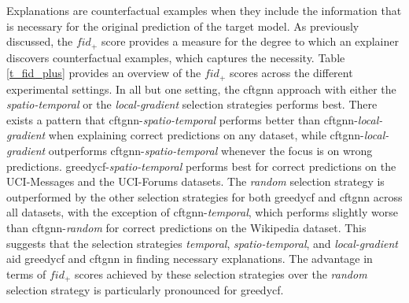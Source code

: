 Explanations are counterfactual examples when they include the information that is necessary for the original prediction of the target model. As previously discussed, the $fid_+$ score provides a measure for the degree to which an explainer discovers counterfactual examples, which captures the necessity. Table \ref{t_fid_plus} provides an overview of the $fid_+$ scores across the different experimental settings. In all but one setting, the \gls{cftgnn} approach with either the \textit{spatio-temporal} or the \textit{local-gradient} selection strategies performs best. There exists a pattern that \gls{cftgnn}-\textit{spatio-temporal} performs better than \gls{cftgnn}-\textit{local-gradient} when explaining correct predictions on any dataset, while \gls{cftgnn}-\textit{local-gradient} outperforms \gls{cftgnn}-\textit{spatio-temporal} whenever the focus is on wrong predictions. \gls{greedycf}-\textit{spatio-temporal} performs best for correct predictions on the UCI-Messages and the UCI-Forums datasets. The \textit{random} selection strategy is outperformed by the other selection strategies for both \gls{greedycf} and \gls{cftgnn} across all datasets, with the exception of \gls{cftgnn}-\textit{temporal}, which performs slightly worse than \gls{cftgnn}-\textit{random} for correct predictions on the Wikipedia dataset. This suggests that the selection strategies \textit{temporal}, \textit{spatio-temporal}, and \textit{local-gradient} aid \gls{greedycf} and \gls{cftgnn} in finding necessary explanations. The advantage in terms of $fid_+$ scores achieved by these selection strategies over the \textit{random} selection strategy is particularly pronounced for \gls{greedycf}.





